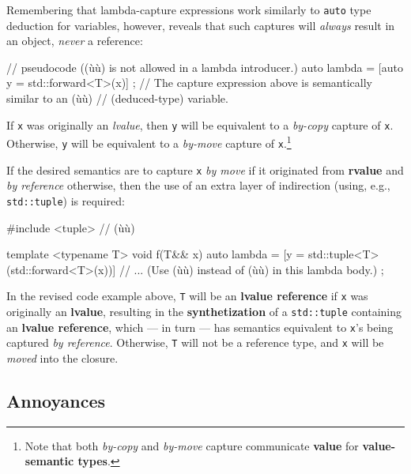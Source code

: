 Remembering that lambda-capture expressions work similarly to
\texttt{auto} type deduction for variables, however,
reveals that such captures will \emph{always} result in an object, \emph{never} a reference:

\begin{emcppslisting}[emcppsignore={pseudocode}]
// pseudocode ((ù{}ù) is not allowed in a lambda introducer.)
auto lambda = [auto y = std::forward<T>(x)] { };
    // The capture expression above is semantically similar to an (ù{}ù)
    // (deduced-type) variable.
\end{emcppslisting}
    
\noindent If \texttt{x} was originally an \emph{lvalue}, then \texttt{y} will be
equivalent to a \emph{by-copy} capture of \texttt{x}. Otherwise,
\texttt{y} will be equivalent to a \emph{by-move} capture of
\texttt{x}.{\cprotect\footnote{Note that both \emph{by-copy} and
\emph{by-move} capture communicate \textbf{value} for
  \textbf{value-semantic types}.}}

If the desired semantics are to capture \texttt{x} \emph{by move} if it
originated from \textbf{rvalue} and \emph{by reference} otherwise, then
the use of an extra layer of indirection (using, e.g.,
\texttt{std::tuple}) is required:

\begin{emcppslisting}[emcppsstandards={c++14}]
#include <tuple>  // (ù{}ù)

template <typename T>
void f(T&& x)
{
    auto lambda = [y = std::tuple<T>(std::forward<T>(x))]
    {
        // ... (Use (ù{}ù) instead of (ù{}ù) in this lambda body.)
    };
}
\end{emcppslisting}
    
\noindent In the revised code example above, \texttt{T} will be an \textbf{lvalue
reference} if \texttt{x} was originally an \textbf{lvalue}, resulting in
the \textbf{synthetization} of a \texttt{std::tuple} containing an
\textbf{lvalue reference}, which --- in turn --- has semantics
equivalent to \texttt{x}'s being captured \emph{by reference}.
Otherwise, \texttt{T} will not be a reference type, and \texttt{x} will
be \emph{moved} into the closure.

\subsection[Annoyances]{Annoyances}\label{annoyances-lambdacapture}

